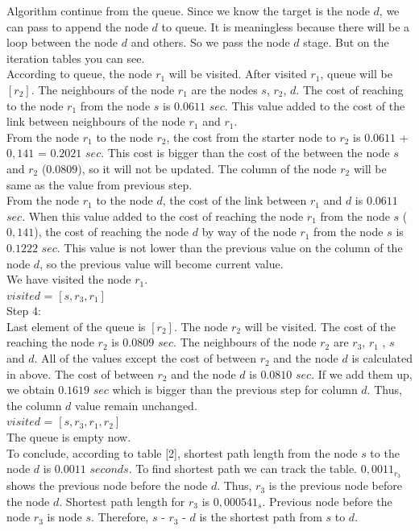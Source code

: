 \documentclass[conference]{IEEEtran}
\begin{document}
Algorithm continue from the queue. Since we know the target is the node $d$, we can pass to append the node $d$ to queue. It is meaningless because there will be a loop between the node $d$ and others. So we pass the node $d$ stage. But on the iteration tables you can see. \\
According to queue, the node $r_1$ will be visited. After visited $r_1$, queue will be $[r_2]$. The neighbours of the node $r_1$ are the nodes  $s$, $r_2$, $d$. The cost of reaching to the node $r_1$ from the node $s$ is $0.0611$ $sec$. This value added to the cost of the link between neighbours of the node $r_1$ and $r_1$. \\
From the node $r_1$ to the node $r_2$, the cost from the starter node to $r_2$ is $0.0611$ + $0,141$ = $0.2021$ $sec$. This cost is bigger than the cost of the between the node $s$ and $r_2$ ($0.0809$), so it will not be updated. The column of the node $r_2$ will be same as the value from previous step. \\
From the node $r_1$ to the node $d$, the cost of the link between $r_1$ and $d$ is $0.0611$ $sec$. When this value added to the cost of reaching the node $r_1$ from the node $s$ ($0,141$), the cost of reaching the node $d$ by way of the node $r_1$ from the node $s$ is $0.1222$ $sec$. This value is not lower than the previous value on the column of the node $d$, so the previous value will become current value.  \\  
We have visited the node $r_1$. \\
$visited$ = $[s,r_3,r_1]$ \\

Step 4: \\

Last element of the queue is $[r_2]$. The node $r_2$ will be visited. The cost of the reaching the node $r_2$ is  $0.0809$ $sec$. The neighbours of the node $r_2$ are $r_3$, $r_1$ , $s$ and $d$. All of the values except the cost of between $r_2$ and the node $d$ is calculated in above. The cost of between $r_2$ and the node $d$ is $0.0810$ $sec$. If we add them up, we obtain $0.1619$ $sec$ which is bigger than the previous step for column $d$. Thus, the column $d$ value remain unchanged. \\
 $visited$ = $[s,r_3,r_1, r_2]$ \\
The queue is empty now. \\

To conclude, according to table [2], shortest path length from the node $s$ to the node $d$ is $0.0011$ $seconds$. To find shortest path we can track the table. $0,0011_{r_3}$ shows the previous node before the node $d$. Thus, $r_3$ is the previous node before the node $d$. Shortest path length for  $r_3$ is $0,000541_{s}$. Previous node before the node $r_3$ is node $s$. Therefore, $s$ - $r_3$ - $d$ is the shortest path from $s$ to $d$. 
\\
\end{document}
